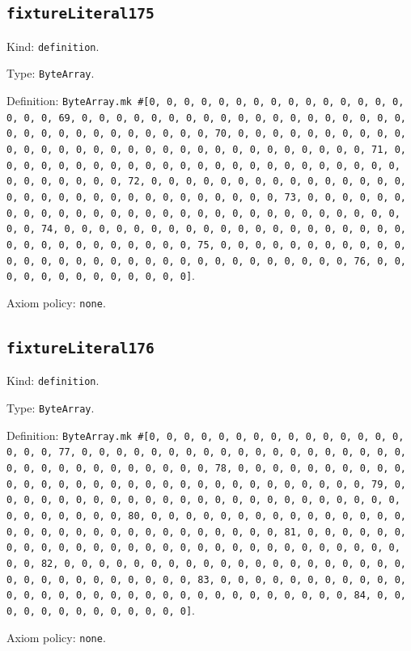 \documentclass[11pt]{article}
\begin{document}
\subsection*{\texttt{fixtureLiteral175}}
\noindent Kind: \texttt{definition}.\par
\noindent Type: \texttt{ByteArray}.\par
\noindent Definition: \texttt{ByteArray.mk \#[0, 0, 0, 0, 0, 0, 0, 0, 0, 0, 0, 0, 0, 0, 0, 0, 0, 0, 69, 0, 0, 0, 0, 0, 0, 0, 0, 0, 0, 0, 0, 0, 0, 0, 0, 0, 0, 0, 0, 0, 0, 0, 0, 0, 0, 0, 0, 0, 0, 0, 70, 0, 0, 0, 0, 0, 0, 0, 0, 0, 0, 0, 0, 0, 0, 0, 0, 0, 0, 0, 0, 0, 0, 0, 0, 0, 0, 0, 0, 0, 0, 0, 71, 0, 0, 0, 0, 0, 0, 0, 0, 0, 0, 0, 0, 0, 0, 0, 0, 0, 0, 0, 0, 0, 0, 0, 0, 0, 0, 0, 0, 0, 0, 0, 72, 0, 0, 0, 0, 0, 0, 0, 0, 0, 0, 0, 0, 0, 0, 0, 0, 0, 0, 0, 0, 0, 0, 0, 0, 0, 0, 0, 0, 0, 0, 0, 73, 0, 0, 0, 0, 0, 0, 0, 0, 0, 0, 0, 0, 0, 0, 0, 0, 0, 0, 0, 0, 0, 0, 0, 0, 0, 0, 0, 0, 0, 0, 0, 74, 0, 0, 0, 0, 0, 0, 0, 0, 0, 0, 0, 0, 0, 0, 0, 0, 0, 0, 0, 0, 0, 0, 0, 0, 0, 0, 0, 0, 0, 0, 0, 75, 0, 0, 0, 0, 0, 0, 0, 0, 0, 0, 0, 0, 0, 0, 0, 0, 0, 0, 0, 0, 0, 0, 0, 0, 0, 0, 0, 0, 0, 0, 0, 76, 0, 0, 0, 0, 0, 0, 0, 0, 0, 0, 0, 0, 0]}.\par
\noindent Axiom policy: \texttt{none}.\par
\subsection*{\texttt{fixtureLiteral176}}
\noindent Kind: \texttt{definition}.\par
\noindent Type: \texttt{ByteArray}.\par
\noindent Definition: \texttt{ByteArray.mk \#[0, 0, 0, 0, 0, 0, 0, 0, 0, 0, 0, 0, 0, 0, 0, 0, 0, 0, 77, 0, 0, 0, 0, 0, 0, 0, 0, 0, 0, 0, 0, 0, 0, 0, 0, 0, 0, 0, 0, 0, 0, 0, 0, 0, 0, 0, 0, 0, 0, 0, 78, 0, 0, 0, 0, 0, 0, 0, 0, 0, 0, 0, 0, 0, 0, 0, 0, 0, 0, 0, 0, 0, 0, 0, 0, 0, 0, 0, 0, 0, 0, 0, 79, 0, 0, 0, 0, 0, 0, 0, 0, 0, 0, 0, 0, 0, 0, 0, 0, 0, 0, 0, 0, 0, 0, 0, 0, 0, 0, 0, 0, 0, 0, 0, 80, 0, 0, 0, 0, 0, 0, 0, 0, 0, 0, 0, 0, 0, 0, 0, 0, 0, 0, 0, 0, 0, 0, 0, 0, 0, 0, 0, 0, 0, 0, 0, 81, 0, 0, 0, 0, 0, 0, 0, 0, 0, 0, 0, 0, 0, 0, 0, 0, 0, 0, 0, 0, 0, 0, 0, 0, 0, 0, 0, 0, 0, 0, 0, 82, 0, 0, 0, 0, 0, 0, 0, 0, 0, 0, 0, 0, 0, 0, 0, 0, 0, 0, 0, 0, 0, 0, 0, 0, 0, 0, 0, 0, 0, 0, 0, 83, 0, 0, 0, 0, 0, 0, 0, 0, 0, 0, 0, 0, 0, 0, 0, 0, 0, 0, 0, 0, 0, 0, 0, 0, 0, 0, 0, 0, 0, 0, 0, 84, 0, 0, 0, 0, 0, 0, 0, 0, 0, 0, 0, 0, 0]}.\par
\noindent Axiom policy: \texttt{none}.\par
\end{document}
